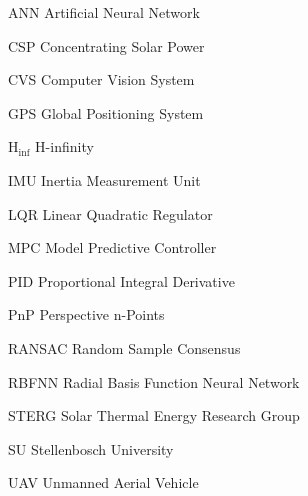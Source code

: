 \begin{Nomencl}[2cm]
   \item[ANN]		Artificial Neural Network
   \item[CSP] 		Concentrating Solar Power
   \item[CVS] 		Computer Vision System
   \item[GPS] 		Global Positioning System	
   \item[H$_{\inf}$]	H-infinity 
   \item[IMU]		Inertia Measurement Unit
   \item[LQR]		Linear Quadratic Regulator
   \item[MPC]		Model Predictive Controller
   \item[PID]		Proportional Integral Derivative
   \item[PnP]		Perspective n-Points
   \item[RANSAC]	Random Sample Consensus
   \item[RBFNN]		Radial Basis Function Neural Network
   \item[STERG]		Solar Thermal Energy Research Group
   \item[SU]		Stellenbosch University
   \item[UAV]		Unmanned Aerial Vehicle

\end{Nomencl}

\endinput
